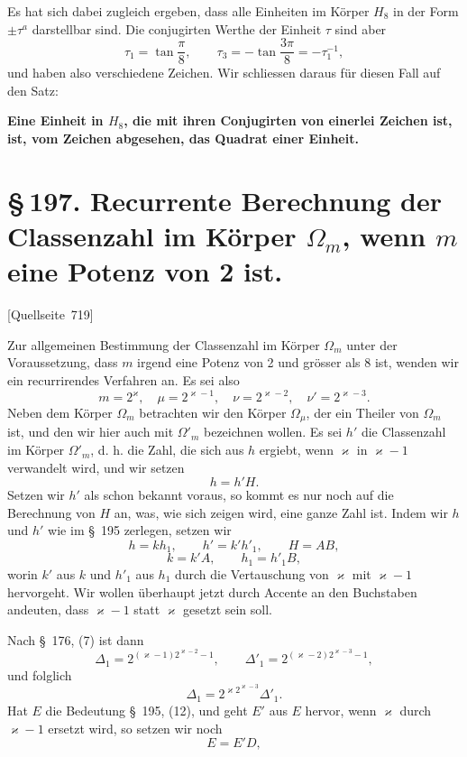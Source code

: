 \documentclass[11pt]{article}
\newcommand{\srcpage}[1]{\par\medskip\noindent\textsf{[Quellseite~#1]}\par\smallskip}
\begin{document}
Es hat sich dabei zugleich ergeben, dass alle Einheiten im Körper $H_8$ in der Form $\pm\tau^a$ darstellbar sind. Die conjugirten Werthe der Einheit $\tau$ sind aber
\[
\tau_1=\tan\frac\pi8,
\qquad
\tau_3=-\tan\frac{3\pi}{8}=-\tau_1^{-1},
\]
und haben also verschiedene Zeichen. Wir schliessen daraus für diesen Fall auf den Satz:
\begin{center}
\textbf{Eine Einheit in $H_8$, die mit ihren Conjugirten von einerlei Zeichen ist, ist, vom Zeichen abgesehen, das Quadrat einer Einheit.}
\end{center}

\section*{\S\,197. Recurrente Berechnung der Classenzahl im Körper $\Omega_m$, wenn $m$ eine Potenz von 2 ist.}

\srcpage{719}
Zur allgemeinen Bestimmung der Classenzahl im Körper $\Omega_m$ unter der Voraussetzung, dass $m$ irgend eine Potenz von 2 und grösser als 8 ist, wenden wir ein recurrirendes Verfahren an. Es sei also
\begin{equation}
m=2^\varkappa,
\quad \mu=2^{\varkappa-1},
\quad \nu=2^{\varkappa-2},
\quad \nu'=2^{\varkappa-3}.
\tag{1}
\end{equation}
Neben dem Körper $\Omega_m$ betrachten wir den Körper $\Omega_\mu$, der ein Theiler von $\Omega_m$ ist, und den wir hier auch mit $\Omega'_m$ bezeichnen wollen. Es sei $h'$ die Classenzahl im Körper $\Omega'_m$, d. h. die Zahl, die sich aus $h$ ergiebt, wenn $\varkappa$ in $\varkappa-1$ verwandelt wird, und wir setzen
\begin{equation}
h=h'H.
\tag{2}
\end{equation}
Setzen wir $h'$ als schon bekannt voraus, so kommt es nur noch auf die Berechnung von $H$ an, was, wie sich zeigen wird, eine ganze Zahl ist. Indem wir $h$ und $h'$ wie im \S~195 zerlegen, setzen wir
\begin{equation}
h=kh_1,
\qquad
h'=k'h'_1,
\qquad
H=AB,
\tag{3}
\end{equation}
\begin{equation}
k=k'A,
\qquad
h_1=h'_1B,
\tag{4}
\end{equation}
worin $k'$ aus $k$ und $h'_1$ aus $h_1$ durch die Vertauschung von $\varkappa$ mit $\varkappa-1$ hervorgeht. Wir wollen überhaupt jetzt durch Accente an den Buchstaben andeuten, dass $\varkappa-1$ statt $\varkappa$ gesetzt sein soll.

Nach \S~176, (7) ist dann
\[
\Delta_1=2^{(\varkappa-1)2^{\varkappa-2}-1},
\qquad
\Delta'_1=2^{(\varkappa-2)2^{\varkappa-3}-1},
\]
und folglich
\begin{equation}
\Delta_1=2^{\varkappa2^{\varkappa-3}}\Delta'_1.
\tag{5}
\end{equation}
Hat $E$ die Bedeutung \S~195, (12), und geht $E'$ aus $E$ hervor, wenn $\varkappa$ durch $\varkappa-1$ ersetzt wird, so setzen wir noch
\begin{equation}
E=E'D,
\tag{6}
\end{equation}
\end{document}
